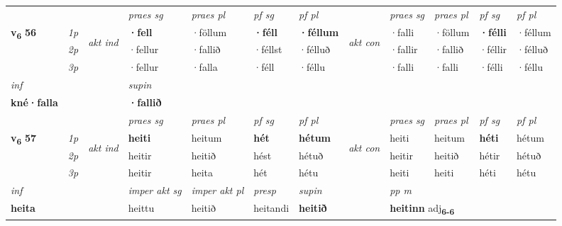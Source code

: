 \begin{longtable}[l]{X>{\footnotesize\itshape}llXXXXlXXXX}
 & &   & \textit{praes sg}  & \textit{praes pl}    & \textit{ pf sg} & \textit{pf pl} & & \textit{praes sg}  & \textit{praes pl}    & \textit{pf sg} & \textit{pf pl }  \\ \cmidrule{4-7} \cmidrule{9-12}
 \multirow{2}{*}{{{\textbf{v{\textsubscript{6}}} \Large{\textbf{56}}}}}  & 1p & \multirow{3}{*}{\begin{turn}{90}\textit{akt ind}\end{turn}} & \textbf{·fell} & ·föllum & \textbf{·féll} & \textbf{·féllum} & \multirow{3}{*}{\begin{turn}{90}\textit{akt con}\end{turn}} &·falli & ·föllum & \textbf{·félli} & ·féllum\\*
 & 2p &  &  ·fellur  & ·fallið & ·féllst & ·félluð & & ·fallir & ·fallið & ·féllir & ·félluð \\*
 & 3p &  & ·fellur & ·falla & ·féll & ·féllu & & ·falli & ·falli& ·félli & ·féllu \\*
\cmidrule{4-7} \cmidrule{9-12}

   {\textit{inf}} & &      & \textit{supin}   \\*
  {\textbf{kné\allowbreak ·falla}} & &      &  \textbf{·fallið}   \\*

\midrule

 & &   & \textit{praes sg}  & \textit{praes pl}    & \textit{ pf sg} & \textit{pf pl} & & \textit{praes sg}  & \textit{praes pl}    & \textit{pf sg} & \textit{pf pl }  \\ \cmidrule{4-7} \cmidrule{9-12}
 \multirow{2}{*}{{{\textbf{v{\textsubscript{6}}} \Large{\textbf{57}}}}}  & 1p & \multirow{3}{*}{\begin{turn}{90}\textit{akt ind}\end{turn}} & \textbf{heiti} & heitum & \textbf{hét} & \textbf{hétum} & \multirow{3}{*}{\begin{turn}{90}\textit{akt con}\end{turn}} &heiti & heitum & \textbf{héti} & hétum\\*
 & 2p &  &  heitir  & heitið & hést & hétuð & & heitir & heitið & hétir & hétuð \\*
 & 3p &  & heitir & heita & hét & hétu & & heiti & heiti& héti & hétu \\*
\cmidrule{4-7} \cmidrule{9-12}

   {\textit{inf}} & &  & \textit{imper akt sg} & \textit{imper akt pl}   & \textit{presp} & \textit{supin}  && \textit{pp m} \\*
  {\textbf{heita}} & && heittu  & heitið   & heitandi &  \textbf{heitið}  && \multicolumn{2}{l}{\textbf{heitinn} adj\textbf{\textsubscript{6-6}}} \\*


\end{longtable}
